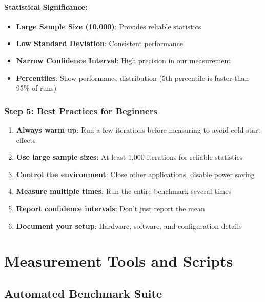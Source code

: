 \documentclass[12pt,a4paper]{article}
\begin{document}
\paragraph{Statistical Significance:}
\begin{itemize}
    \item \textbf{Large Sample Size (10,000)}: Provides reliable statistics
    \item \textbf{Low Standard Deviation}: Consistent performance
    \item \textbf{Narrow Confidence Interval}: High precision in our measurement
    \item \textbf{Percentiles}: Show performance distribution (5th percentile is faster than 95\% of runs)
\end{itemize}

\subsubsection{Step 5: Best Practices for Beginners}

\begin{enumerate}
    \item \textbf{Always warm up}: Run a few iterations before measuring to avoid cold start effects
    \item \textbf{Use large sample sizes}: At least 1,000 iterations for reliable statistics
    \item \textbf{Control the environment}: Close other applications, disable power saving
    \item \textbf{Measure multiple times}: Run the entire benchmark several times
    \item \textbf{Report confidence intervals}: Don't just report the mean
    \item \textbf{Document your setup}: Hardware, software, and configuration details
\end{enumerate}

\section{Measurement Tools and Scripts}

\subsection{Automated Benchmark Suite}
\end{document}
